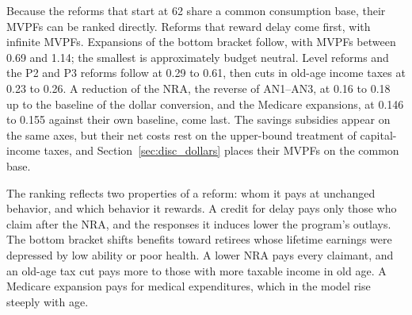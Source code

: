 Because the reforms that start at 62 share a common consumption base, their MVPFs can be ranked directly. Reforms that reward delay come first, with infinite MVPFs. Expansions of the bottom bracket follow, with MVPFs between 0.69 and 1.14; the smallest is approximately budget neutral. Level reforms and the P2 and P3 reforms follow at 0.29 to 0.61, then cuts in old-age income taxes at 0.23 to 0.26. A reduction of the NRA, the reverse of AN1--AN3, at 0.16 to 0.18 up to the baseline of the dollar conversion, and the Medicare expansions, at 0.146 to 0.155 against their own baseline, come last. The savings subsidies appear on the same axes, but their net costs rest on the upper-bound treatment of capital-income taxes, and Section~\ref{sec:disc_dollars} places their MVPFs on the common base.

The ranking reflects two properties of a reform: whom it pays at unchanged behavior, and which behavior it rewards. A credit for delay pays only those who claim after the NRA, and the responses it induces lower the program's outlays. The bottom bracket shifts benefits toward retirees whose lifetime earnings were depressed by low ability or poor health. A lower NRA pays every claimant, and an old-age tax cut pays more to those with more taxable income in old age. A Medicare expansion pays for medical expenditures, which in the model rise steeply with age.
